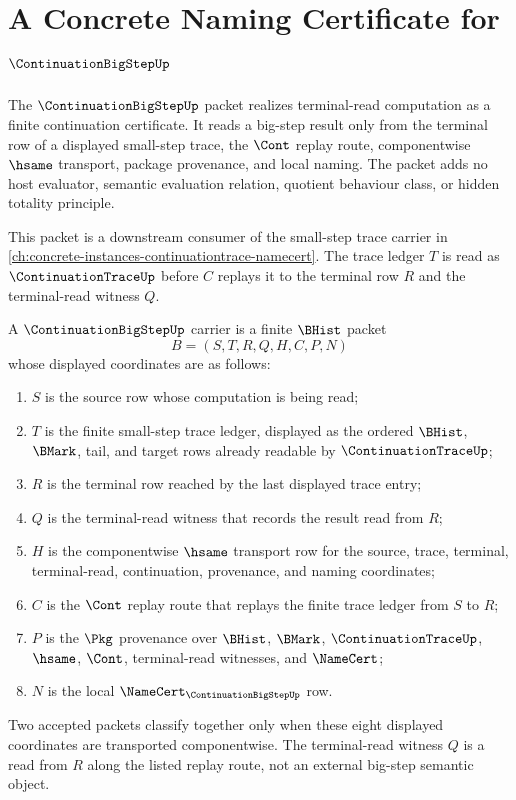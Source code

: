 \chapter{A Concrete Naming Certificate for $\ContinuationBigStepUp$}
\label{ch:concrete-instances-continuationbigstep-namecert}

The $\ContinuationBigStepUp$ packet realizes terminal-read computation as a finite continuation certificate. It reads a big-step result only from the terminal row of a displayed small-step trace, the $\Cont$ replay route, componentwise $\hsame$ transport, package provenance, and local naming. The packet adds no host evaluator, semantic evaluation relation, quotient behaviour class, or hidden totality principle.

This packet is a downstream consumer of the small-step trace carrier in \autoref{ch:concrete-instances-continuationtrace-namecert}. The trace ledger $T$ is read as $\ContinuationTraceUp$ before $C$ replays it to the terminal row $R$ and the terminal-read witness $Q$.

\begin{definition}
\label{def:continuation-big-step-carrier}
A $\ContinuationBigStepUp$ carrier is a finite $\BHist$ packet
$$
B=(S,T,R,Q,H,C,P,N)
$$
whose displayed coordinates are as follows:
\begin{enumerate}
\item $S$ is the source row whose computation is being read;
\item $T$ is the finite small-step trace ledger, displayed as the ordered $\BHist$, $\BMark$, tail, and target rows already readable by $\ContinuationTraceUp$;
\item $R$ is the terminal row reached by the last displayed trace entry;
\item $Q$ is the terminal-read witness that records the result read from $R$;
\item $H$ is the componentwise $\hsame$ transport row for the source, trace, terminal, terminal-read, continuation, provenance, and naming coordinates;
\item $C$ is the $\Cont$ replay route that replays the finite trace ledger from $S$ to $R$;
\item $P$ is the $\Pkg$ provenance over $\BHist$, $\BMark$, $\ContinuationTraceUp$, $\hsame$, $\Cont$, terminal-read witnesses, and $\NameCert$;
\item $N$ is the local $\NameCert_{\ContinuationBigStepUp}$ row.
\end{enumerate}
Two accepted packets classify together only when these eight displayed coordinates are transported componentwise. The terminal-read witness $Q$ is a read from $R$ along the listed replay route, not an external big-step semantic object.
\end{definition}

